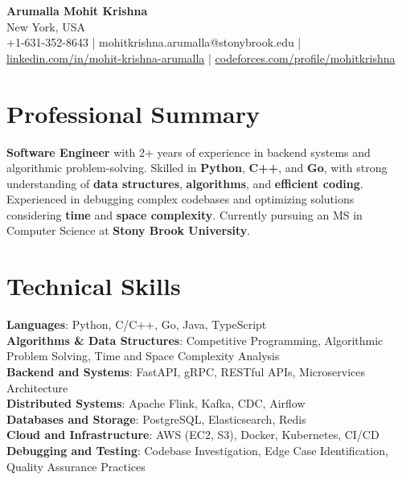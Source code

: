 \documentclass[letterpaper,11pt]{article}
\begin{document}
\begin{center}
  {\Large \textbf{Arumalla Mohit Krishna}} \\
  New York, USA \\
  +1-631-352-8643 \enspace | \enspace mohitkrishna.arumalla@stonybrook.edu \enspace | \enspace \href{https://www.linkedin.com/in/mohit-krishna-arumalla}{linkedin.com/in/mohit-krishna-arumalla} \enspace | \enspace \href{https://codeforces.com/profile/mohitkrishna}{codeforces.com/profile/mohitkrishna}
\end{center}

\section{Professional Summary}
  \begin{itemize}[leftmargin=0.15in, label={}]
    \small{\item{
     \textbf{Software Engineer} with 2+ years of experience in backend systems and algorithmic problem-solving. Skilled in \textbf{Python}, \textbf{C++}, and \textbf{Go}, with strong understanding of \textbf{data structures}, \textbf{algorithms}, and \textbf{efficient coding}. Experienced in debugging complex codebases and optimizing solutions considering \textbf{time} and \textbf{space complexity}. Currently pursuing an MS in Computer Science at \textbf{Stony Brook University}.
    }}
  \end{itemize}
\vspace{-16pt}

\section{Technical Skills}
 \begin{itemize}[leftmargin=0.15in, label={}]
    \small{\item{
     \textbf{Languages}: Python, C/C++, Go, Java, TypeScript \\
     \textbf{Algorithms \& Data Structures}: Competitive Programming, Algorithmic Problem Solving, Time and Space Complexity Analysis \\
     \textbf{Backend and Systems}: FastAPI, gRPC, RESTful APIs, Microservices Architecture \\
     \textbf{Distributed Systems}: Apache Flink, Kafka, CDC, Airflow \\
     \textbf{Databases and Storage}: PostgreSQL, Elasticsearch, Redis \\
     \textbf{Cloud and Infrastructure}: AWS (EC2, S3), Docker, Kubernetes, CI/CD \\
     \textbf{Debugging and Testing}: Codebase Investigation, Edge Case Identification, Quality Assurance Practices
    }}
 \end{itemize}
\vspace{-16pt}
\end{document}

